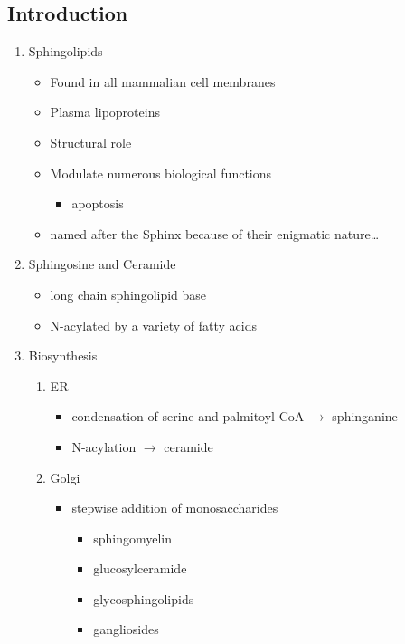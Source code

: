 \documentclass{scrartcl}
\begin{document}
\subsection{Introduction}
\label{sec:org4e6bf52}
\begin{enumerate}
\item Sphingolipids
\label{sec:orgf209158}
\begin{itemize}
\item Found in all mammalian cell membranes
\item Plasma lipoproteins
\item Structural role
\item Modulate numerous biological functions
\begin{itemize}
\item apoptosis
\end{itemize}
\item named after the Sphinx because of their enigmatic nature\ldots{}
\end{itemize}

\item Sphingosine and Ceramide
\label{sec:org3d650ef}

\begin{itemize}
\item long chain sphingolipid base
\item N-acylated by a variety of fatty acids
\end{itemize}


\item Biosynthesis
\label{sec:org8efcfd2}

\begin{enumerate}
\item ER
\label{sec:orgbbd23f1}
\begin{itemize}
\item condensation of serine and palmitoyl-CoA \(\to\) sphinganine
\item N-acylation \(\to\) ceramide
\end{itemize}

\item Golgi
\label{sec:orgc236e74}
\begin{itemize}
\item stepwise addition of monosaccharides
\begin{itemize}
\item sphingomyelin
\item glucosylceramide
\item glycosphingolipids
\item gangliosides
\end{itemize}
\end{itemize}



\end{enumerate}
\end{enumerate}
\end{document}
